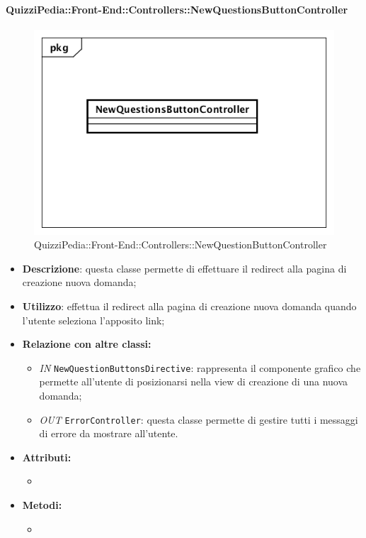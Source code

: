 \paragraph{QuizziPedia::Front-End::Controllers::NewQuestionsButtonController}
\begin{figure}
	\centering
	\includegraphics[scale=0.45]{UML/Classi/Front-End/QuizziPedia_Front-end_Controller_NewQuestionsButtonController.png}
	\caption{QuizziPedia::Front-End::Controllers::NewQuestionButtonController}
\end{figure}
\begin{itemize}
	\item \textbf{Descrizione}: questa classe permette di effettuare il redirect alla pagina di creazione nuova domanda;
	\item \textbf{Utilizzo}: effettua il redirect alla pagina di creazione nuova domanda quando l'utente seleziona l'apposito link;
	\item \textbf{Relazione con altre classi:}
	\begin{itemize}
		\item \textit{IN} \texttt{NewQuestionButtonsDirective}: rappresenta il componente grafico che permette all'utente di posizionarsi nella view di creazione di una nuova domanda; 
		\item \textit{OUT} \texttt{ErrorController}: questa classe permette di gestire tutti i messaggi di errore da mostrare all'utente.
	\end{itemize}
	\item \textbf{Attributi:}
	\begin{itemize}
		\item 
	\end{itemize}
	\item \textbf{Metodi:}
	\begin{itemize}
		\item 
	\end{itemize}
\end{itemize}

